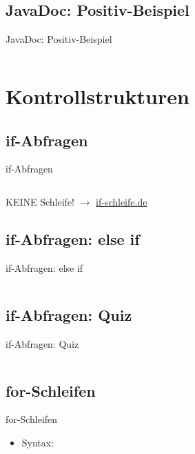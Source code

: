 \documentclass[usepdftitle=false,hyperref={pdfpagelabels=false}]{beamer}
\begin{document}
\subsection{JavaDoc: Positiv-Beispiel}
\begin{frame}{JavaDoc: Positiv-Beispiel}
  \inputminted[linenos=true, numbersep=5pt, tabsize=4, fontsize=\small, firstline=9, lastline=16]{java}{JavaDoc.java}
\end{frame}

\section{Kontrollstrukturen}
\subsection{if-Abfragen}
\begin{frame}{if-Abfragen}
  \inputminted[linenos=true, numbersep=5pt, tabsize=4, fontsize=\small, firstline=1, lastline=5]{java}{Kontrollstrukturen.java}

  KEINE Schleife! $\rightarrow$ \href{http://if-schleife.de/}{if-schleife.de}
\end{frame}

\subsection{if-Abfragen: else if}
\begin{frame}{if-Abfragen: else if}
  \inputminted[linenos=true, numbersep=5pt, tabsize=4, fontsize=\small, firstline=7, lastline=13]{java}{Kontrollstrukturen.java}
\end{frame}

\subsection{if-Abfragen: Quiz}
\begin{frame}{if-Abfragen: Quiz}
  \inputminted[linenos=true, numbersep=5pt, tabsize=4, fontsize=\small, frame=lines]{java}{QuizIf.java}
\end{frame}

\subsection{for-Schleifen}
\begin{frame}{for-Schleifen}
  \begin{itemize}
    \item Syntax: 
  \end{itemize}

  \inputminted[linenos=true, numbersep=5pt, tabsize=4, fontsize=\small, firstline=39, lastline=41]{java}{Kontrollstrukturen.java}
\end{frame}
\end{document}
